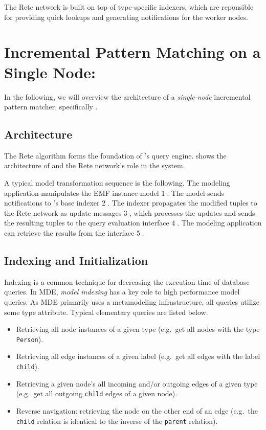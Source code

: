 The Rete network is built on top of type-specific indexers, which are reponsible for providing quick lookups and generating notifications for the worker nodes.




\section{Incremental Pattern Matching on a Single Node: \eiq{}}
\label{eiq-architecture}

In the following, we will overview the architecture of a \emph{single-node} incremental pattern matcher, specifically \eiq{}.

\subsection{Architecture}

The Rete algorithm forms the foundation of \eiq{}'s query engine.  shows the architecture of \eiq{} and the Rete network's role in the system. 


A typical model transformation sequence is the following. The modeling application manipulates the EMF instance model \textcircled{1}. The model sends notifications to \eiq{}'s base indexer \textcircled{2}. The indexer propagates the modified tuples to the Rete network as update messages \textcircled{3}, which processes the updates and sends the resulting tuples to the query evaluation interface \textcircled{4}. The modeling application can retrieve the results from the interface \textcircled{5}.

\subsection{Indexing and Initialization}
\label{indexing}

Indexing is a common technique for decreasing the execution time of database queries. In MDE, \emph{model indexing} has a key role to high performance model queries. As MDE primarily uses a metamodeling infrastructure, all queries utilize some type attribute. Typical elementary queries are listed below.

\begin{itemize}
  \item Retrieving all node instances of a given type (e.g.\ get all nodes with the type \texttt{Person}).
  \item Retrieving all edge instances of a given label (e.g.\ get all edges with the label \texttt{child}).
  \item Retrieving a given node's all incoming and/or outgoing edges of a given type (e.g.\ get all outgoing \texttt{child} edges of a given node). 
  \item Reverse navigation: retrieving the node on the other end of an edge (e.g.\ the \texttt{child} relation is identical to the inverse of the \texttt{parent} relation). 
\end{itemize}

